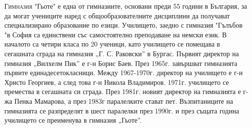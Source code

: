 \begin{multicols}{3}
\noindent \lettrine[lraise=0.2, nindent=0em, slope=-.5em]{Г}{имназия} "Гьоте" е 
една от гимназиите, основани преди 55 години в България, за да могат  учениците  
наред с общообразователните дисциплини да получават специализирано образование 
по езици. Училището, заедно с гимназия "Гълъбов "в София са единствени със 
самостоятелно преподаване на немски език.
В началото са четири класа по 20 ученици, като училището се помещава в сегашната 
сграда на гимназия „Г. С. Раковски” в Бургас. Първият директор на гимназия 
„Вилхелм Пик” е г-н Борис Баев. През 1965г. завършват гимназията първите 
единадесетокласници. Между 1967-1970г. директор на училището е г-н Христо 
Георгиев, а след това г-н Никола Владимиров. 1971г. училището се премества в 
сегашната си сграда. През 1981г. новият директор на гимназията е г-жа Пенка 
Мамарова, а през 1983г паралелките стават пет. Възпитаниците на гимназията се 
разпределят в шест паралелки през 1990г. и през същата година училището се 
преименува в гимназия „Гьоте”. 

\vspace{-5cm}


\end{multicols}
